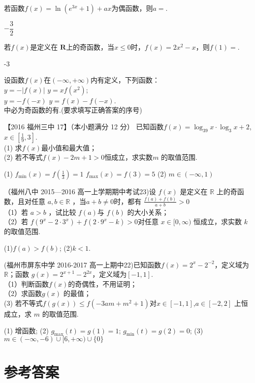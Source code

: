\begin{exercise}
      若函数$f(x)=\ln (e^{3x}+1)+ax$为偶函数，则$ a= $\tk.
      \begin{answer}
        $-\dfrac{3}2$
      \end{answer}
    \item
      若$f(x)$是定义在 $\mathbf{R} $上的奇函数，当$ x\le0 $时，$f(x)=2x^2-x$，则$f(1)=$\tk.
      \begin{answer}
        -3
      \end{answer}
    \item
      设函数$f(x)$在$ \left(-\infty,+\infty\right) $内有定义，下列函数：\\
       $ y=-\left|f(x)\right| $\qquad{} $ y=xf(x^2) $;\\
       $ y=-f(-x) $\qquad {} $ y=f(x)-f(-x) $.\\
      中必为奇函数的有\tk.(要求填写正确答案的序号)
      \begin{answer}
      \end{answer}
    \item
      【2016 福州三中 17】（本小题满分 12 分）
      已知函数$f(x)=\log_39x\cdot\log_3x+2 $,$x\in[\frac19,3]$.\\
      (1) 求$f(x)$最小值和最大值；\\
      (2) 若不等式$f(x)-2m+1>0 $恒成立，求实数$m$ 的取值范围.
      \begin{answer}
        (1) $f_{\min}(x)=f(\frac13)=1$
              $f_{\max}(x)=f(3)=5$
        (2) $m\in(-\infty,1)$
      \end{answer}
    \vspace{22em}
    \item
      （福州八中 2015—2016 高一上学期期中考试23)设 $f (x )$ 是定义在 $\mathbb{R}$ 上的奇函数，且对任意 $a,b\in \mathbb{R}$ ，当$a+b\neq0$时，都有 $\frac{f(a)+f(b)}{a+b}>0$\\
      （1）若 $a> b$ ，试比较 $f (a ) $与 $f (b)$ 的大小关系；\\
      （2）若 $f (9^x- 2\cdot 3^x )+ f ( 2\cdot 9^x-k )> 0 $对任意 $x\in[0,\infty )$ 恒成立，求实数 $k$ 的取值范围.
      \begin{answer}
      (1)$f(a)>f(b)$;
      (2)$k<1$.
      \end{answer}
    \vspace{22em}
    \item
      (福州市屏东中学 2016-2017 高一上期中22)已知函数$f(x)=2^x-2^{-2} $，定义域为$\mathbb{R} $；函数 $g(x)=2^{x+1}-2^{2x} $，定义域为$[-1,1] $.\\
      （1）判断函数$f(x) $的奇偶性，不用证明；\\
      （2）求函数$g(x) $ 的最值；\\
       (3) 若不等式$f(g(x))\leq f(-3am+m^2+1) $对$x\in[-1,1] $,$a\in[-2,2] $ 上恒成立，求 $m$ 的取值范围.
       \begin{answer}
       (1) 增函数; (2) $g_{\max}(t)=g(1)=1 $; $g_{\min}(t)=g(2)=0 $; (3) $m\in (-\infty,-6)\cup[6,+\infty)\cup\{0\} $
      \end{answer}
      \vspace{20em}
  \end{exercise}
\stopexercise
\newpage
\section{参考答案}
\printanswer
